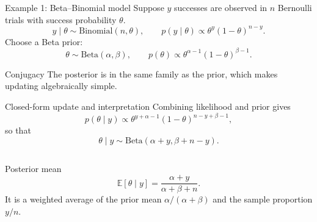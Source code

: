 \documentclass[aspectratio=169]{beamer}
\newcommand{\E}{\mathbb{E}}
\newcommand{\BetaD}{\mathrm{Beta}}
\newcommand{\Binom}{\mathrm{Binomial}}
\begin{document}
\begin{frame}{Example 1: Beta--Binomial model}
Suppose $y$ successes are observed in $n$ Bernoulli trials with success probability $\theta$.
\[
  y\mid\theta \sim \Binom(n,\theta),
  \qquad
  p(y\mid\theta)\propto \theta^y(1-\theta)^{n-y}.
\]
Choose a Beta prior:
\[
  \theta \sim \BetaD(\alpha,\beta),
  \qquad
  p(\theta)\propto \theta^{\alpha-1}(1-\theta)^{\beta-1}.
\]

\begin{block}{Conjugacy}
The posterior is in the same family as the prior, which makes updating algebraically simple.
\end{block}
\end{frame}

\begin{frame}{Closed-form update and interpretation}
Combining likelihood and prior gives
\[
  p(\theta\mid y)\propto \theta^{y+\alpha-1}(1-\theta)^{n-y+\beta-1},
\]
so that
\[
  \theta\mid y \sim \BetaD(\alpha+y,\beta+n-y).
\]

\begin{columns}[T,onlytextwidth]
\begin{block}{Posterior mean}
\[
  \E[\theta\mid y]=\frac{\alpha+y}{\alpha+\beta+n}.
\]
It is a weighted average of the prior mean $\alpha/(\alpha+\beta)$ and the sample proportion $y/n$.
\end{block}

\centering
\vspace{-0.9em}
\end{columns}
\end{frame}
\end{document}
